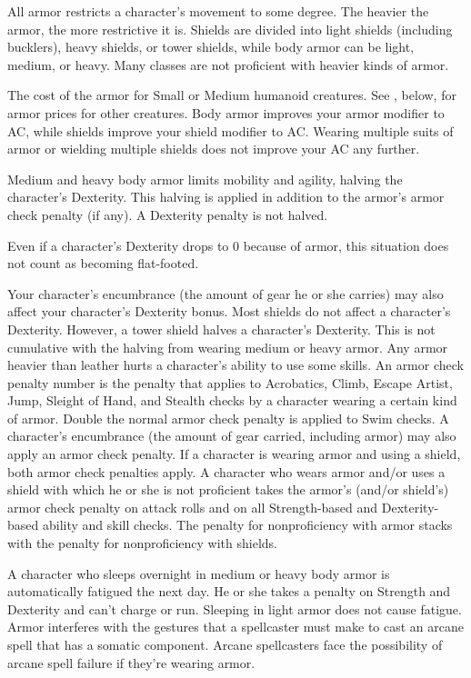  All armor restricts a character's movement to some degree. The heavier the armor, the more restrictive it is. Shields are divided into light shields (including bucklers), heavy shields, or tower shields, while body armor can be light, medium, or heavy. Many classes are not proficient with heavier kinds of armor.

 The cost of the armor for Small or Medium humanoid
creatures. See , below, for armor prices for other creatures.
 Body armor improves your armor modifier to AC, while shields improve your shield modifier to AC. Wearing multiple suits of armor or wielding multiple shields does not improve your AC any further.

 Medium and heavy body armor limits mobility and agility, halving the character's Dexterity. This halving is applied in addition to the armor's armor check penalty (if any). A Dexterity penalty is not halved.

Even if a character's Dexterity drops to 0 because of armor, this situation does not count as becoming flat-footed.

Your character's encumbrance (the amount of gear he or she carries) may also affect your character's Dexterity bonus.
 Most shields do not affect a character's Dexterity. However, a tower shield halves a character's Dexterity. This is not cumulative with the halving from wearing medium or heavy armor.
 Any armor heavier than leather hurts a character's ability to use some skills. An armor check penalty number is the penalty that applies to Acrobatics, Climb, Escape Artist, Jump, Sleight of Hand, and Stealth checks by a character wearing a certain kind of armor. Double the normal armor check penalty is applied to Swim checks. A character's encumbrance (the amount of gear carried, including armor) may also apply an armor check penalty.
 If a character is wearing armor and using a shield, both armor check penalties apply.
 A character who wears armor and/or uses a shield with which he or she is not proficient takes the armor's (and/or shield's) armor check penalty on attack rolls and on all Strength-based and Dexterity-based ability and skill checks. The penalty for nonproficiency with armor stacks with the penalty for nonproficiency with shields.

 A character who sleeps overnight in medium or heavy body armor is automatically fatigued the next day. He or she takes a  penalty on Strength and Dexterity and can't charge or run. Sleeping in light armor does not cause fatigue.
 Armor interferes with the gestures that a spellcaster must make to cast an arcane spell that has a somatic component. Arcane spellcasters face the possibility of arcane spell failure if they're wearing armor.

